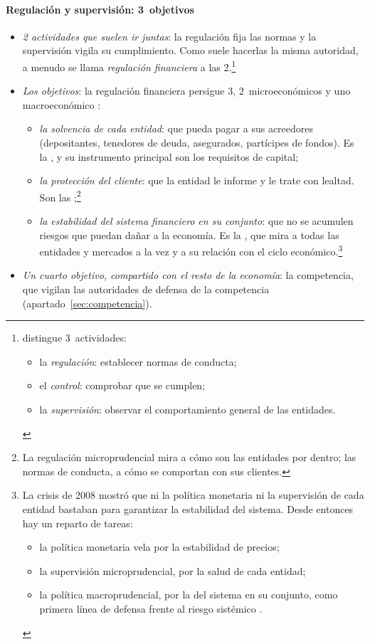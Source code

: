 \documentclass[11pt]{article}
\begin{document}
\paragraph{Regulación y supervisión: 3~objetivos}

\begin{itemize}
\item \emph{2 actividades que suelen ir juntas}: la regulación fija las normas y la supervisión vigila su cumplimiento. Como suele hacerlas la misma autoridad, a menudo se llama \emph{regulación financiera} a las 2.\footnote{ distingue 3~actividades\nocite{Llewellyn1999}:
\begin{itemize}
\item la \emph{regulación}: establecer normas de conducta;
\item el \emph{control}: comprobar que se cumplen;
\item la \emph{supervisión}: observar el comportamiento general de las entidades.
\end{itemize}}
\item \emph{Los objetivos}: la regulación financiera persigue 3, 2~microeconómicos y uno macroeconómico \nocite{DeHaanOosterlooSchoenmaker2012}:
  \begin{itemize}
  \item \emph{la solvencia de cada entidad}: que pueda pagar a sus acreedores (depositantes, tenedores de deuda, asegurados, partícipes de fondos). Es la , y su instrumento principal son los requisitos de capital;
  \item \emph{la protección del cliente}: que la entidad le informe y le trate con lealtad. Son las ;\footnote{La regulación microprudencial mira a cómo son las entidades por dentro; las normas de conducta, a cómo se comportan con sus clientes.}
  \item \emph{la estabilidad del sistema financiero en su conjunto}: que no se acumulen riesgos que puedan dañar a la economía. Es la , que mira a todas las entidades y mercados a la vez y a su relación con el ciclo económico.\footnote{La crisis de 2008 mostró que ni la política monetaria ni la supervisión de cada entidad bastaban para garantizar la estabilidad del sistema. Desde entonces hay un reparto de tareas:
\begin{itemize}
\item la política monetaria vela por la estabilidad de precios;
\item la supervisión microprudencial, por la salud de cada entidad;
\item la política macroprudencial, por la del sistema en su conjunto, como primera línea de defensa frente al riesgo sistémico .
\end{itemize}}
  \end{itemize}
\item \emph{Un cuarto objetivo, compartido con el resto de la economía}: la competencia, que vigilan las autoridades de defensa de la competencia (apartado~\ref{sec:competencia}).
\end{itemize}
\end{document}
